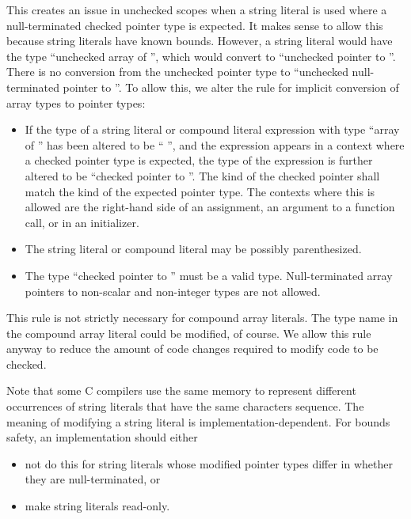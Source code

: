 This creates an issue in unchecked scopes when a string literal is used where
a null-terminated checked pointer type is expected.  It makes sense to allow
this because string literals have known bounds.  However, a string
literal would have the type ``unchecked array of '', which
would convert to ``unchecked pointer to ''.
There is no conversion from the unchecked pointer type to
``unchecked null-terminated pointer to ''.
To allow this, we alter the rule for implicit conversion of array types to pointer types:
\begin{itemize}
\item If the type of a string literal or compound literal expression with type
``array of '' has been altered to be `` \keyword{*}'', and the expression
appears in a context where a checked pointer type is expected, the type of the expression
is further altered to be ``checked pointer to ''.  The kind of the checked
pointer shall match the kind of the expected pointer type. The contexts where this
is allowed are the right-hand side of an assignment, an argument to a function call, or in
an initializer.
\item The string literal or compound literal may be possibly parenthesized.
\item The type ``checked pointer to '' must be a valid type.  Null-terminated array pointers
to non-scalar and non-integer types are not allowed.
\end{itemize}
This rule is not strictly necessary for compound array literals.  The type name in the
compound array literal could be modified, of course.  We allow this rule anyway to reduce
the amount of code changes required to modify code to be checked.

Note that some C compilers use the same memory to represent different
occurrences of string literals that have the same characters
sequence.  The meaning of modifying a string literal is implementation-dependent.
For bounds safety, an implementation should either
\begin{itemize}
\item not do this for string literals whose modified pointer types differ in whether they are null-terminated, or
\item make string literals read-only.
\end{itemize}

